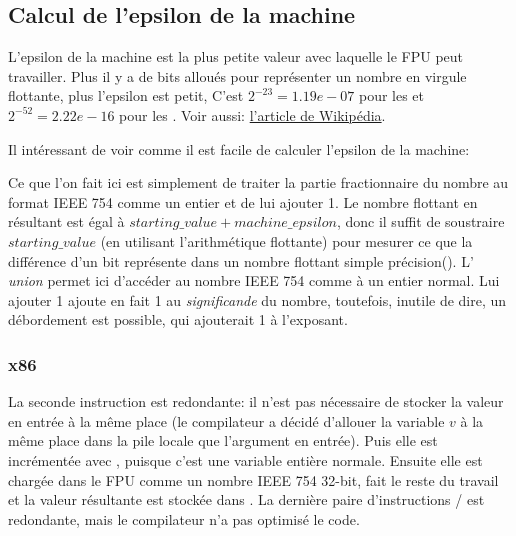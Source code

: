 ﻿\subsection{Calcul de l'epsilon de la machine}

L'epsilon de la machine est la plus petite valeur avec laquelle le \ac{FPU} peut
travailler.
Plus il y a de bits alloués pour représenter un nombre en virgule flottante, plus
l'epsilon est petit,
C'est $2^{-23} = 1.19e-07$ pour les \Tfloat et $2^{-52} = 2.22e-16$ pour les \Tdouble.
Voir aussi: \href{https://en.wikipedia.org/wiki/Arithmetic_underflow}{l'article de Wikipédia}.%

Il intéressant de voir comme il est facile de calculer l'epsilon de la machine:



Ce que l'on fait ici est simplement de traiter la partie fractionnaire du nombre
au format IEEE 754 comme un entier et de lui ajouter 1.
Le nombre flottant en résultant est égal à $starting\_value+machine\_epsilon$, donc
il suffit de soustraire $starting\_value$ (en utilisant l'arithmétique flottante)
pour mesurer ce que la différence d'un bit représente dans un nombre flottant simple
précision(\Tfloat).
L' \emph{union} permet ici d'accéder au nombre IEEE 754 comme à un entier normal.
Lui ajouter 1 ajoute en fait 1 au \emph{significande} du nombre, toutefois, inutile
de dire, un débordement est possible, qui ajouterait 1 à l'exposant.

\subsubsection{x86}



La seconde instruction  est redondante: il n'est pas nécessaire de stocker
la valeur en entrée à la même place (le compilateur a décidé d'allouer la variable
$v$ à la même place dans la pile locale que l'argument en entrée).
Puis elle est incrémentée avec , puisque c'est une variable entière normale.
Ensuite elle est chargée dans le FPU comme un nombre IEEE 754 32-bit, 
fait le reste du travail et la valeur résultante est stockée dans .
La dernière paire d'instructions / est redondante, mais le compilateur
n'a pas optimisé le code.

